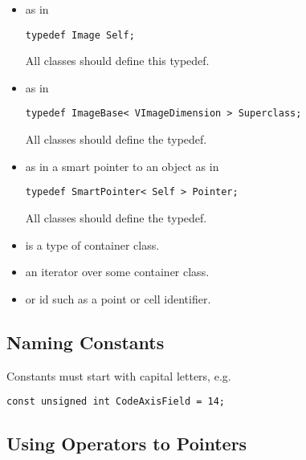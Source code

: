 \begin{itemize}
\item \textbf{} as in

\small
\begin{verbatim}
typedef Image Self;
\end{verbatim}
\normalsize

All classes should define this typedef.
\item \textbf{} as in

\small
\begin{verbatim}
typedef ImageBase< VImageDimension > Superclass;
\end{verbatim}
\normalsize

All classes should define the  typedef.
\item \textbf{} as in a smart pointer to an object as in

\begin{verbatim}
typedef SmartPointer< Self > Pointer;
\end{verbatim}
\normalsize

All classes should define the  typedef.
\item \textbf{} is a type of container class.
\item \textbf{} an iterator over some container class.
\item \textbf{} or id such as a point or cell identifier.
\end{itemize}


\subsection{Naming Constants}
\label{subsec:NamingConstants}

Constants must start with capital letters, e.g.

\small
\begin{verbatim}
const unsigned int CodeAxisField = 14;
\end{verbatim}
\normalsize


\subsection{Using Operators to Pointers}
\label{subsec:UsingOperatorsToPointers}

